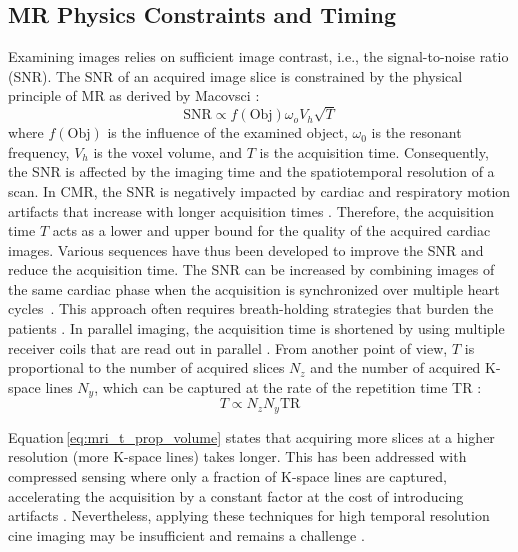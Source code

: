    \subsection{MR Physics Constraints and Timing}
   Examining images relies on sufficient image contrast, i.e., the signal-to-noise ratio (SNR). The SNR of an acquired image slice is constrained by the physical principle of MR as derived by Macovsci \citep{macovski1996noise}: %
        \begin{equation}
        \text{SNR} \propto f\left(\text{Obj}\right) \omega_o V_h \sqrt{T}
        \label{eq:mri_snr}
    \end{equation}
    where $f\left(\text{Obj}\right)$ is the influence of the examined object, $\omega_0$ is the resonant frequency, $V_h$ is the voxel volume, and $T$ is the acquisition time.
    Consequently, the SNR is affected by the imaging time and the spatiotemporal resolution of a scan.
    In CMR, the SNR is negatively impacted by cardiac and respiratory motion artifacts that increase with longer acquisition times \citep{ismail2022cardiac}.
    Therefore, the acquisition time $T$ acts as a lower and upper bound for the quality of the acquired cardiac images. Various sequences have thus been developed to improve the SNR and reduce the acquisition time.
    The SNR can be increased by combining images of the same cardiac phase when the acquisition is synchronized over multiple heart cycles~\citep{ismail2022cardiac}. This approach often requires breath-holding strategies that burden the patients \citep{ridgway2010cardiovascular}.
    In parallel imaging, the acquisition time is shortened by using
    multiple receiver coils that are read out in parallel \citep{pruessmann1999sense, griswold2002generalized,ridgway2010cardiovascular}.
    From another point of view, $T$ is proportional to the number of acquired slices $N_z$ and the number of acquired K-space lines $N_y$, which can be captured at the rate of the repetition time TR \citep{balaban2019basic}:
    \begin{equation}
        T \propto  N_z N_y \text{TR}
        \label{eq:mri_t_prop_volume}
    \end{equation}

    Equation\,\eqref{eq:mri_t_prop_volume} states that acquiring more slices at a higher resolution (more K-space lines) takes longer. This has been addressed with compressed sensing where only a fraction of K-space lines are captured, accelerating the acquisition by a constant factor at the cost of introducing artifacts \citep{lustig2007sparse}.
    Nevertheless, applying these techniques for high temporal resolution cine imaging may be insufficient and remains a challenge \citep{raman202230}.

